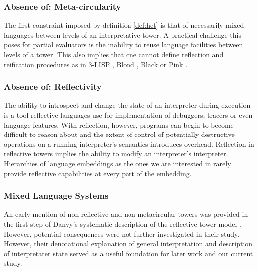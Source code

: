 \documentclass[fleqn]{article}
\theoremstyle{definition}
\begin{document}
\subsubsection{Absence of: Meta-circularity}
The first constraint imposed by definition \ref{def:het} is that of necessarily mixed languages between levels of an interpretative tower. A practical challenge this poses for partial evaluators is the inability to reuse language facilities between levels of a tower. This also implies that one cannot define reflection and reification procedures as in 3-LISP \cite{smith1984reflection}, Blond \cite{danvy1988intensions}, Black \cite{asai1996duplication} or Pink \cite{amin2017collapsing}.

\subsubsection{Absence of: Reflectivity}
The ability to introspect and change the state of an interpreter during execution is a tool reflective languages use for implementation of debuggers, tracers or even language features. With reflection, however, programs can begin to become difficult to reason about and the extent of control of potentially destructive operations on a running interpreter's semantics introduces overhead. Reflection in reflective towers implies the ability to modify an interpreter's interpreter. Hierarchies of language embeddings as the ones we are interested in rarely provide reflective capabilities at every part of the embedding.

\subsubsection{Mixed Language Systems}
An early mention of non-reflective and non-metacircular towers was provided in the first step of Danvy's systematic description of the reflective tower model \cite{danvy1988intensions}. However, potential consequences were not further investigated in their study. However, their denotational explanation of general interpretation and description of interpretater state served as a useful foundation for later work and our current study.
\end{document}
